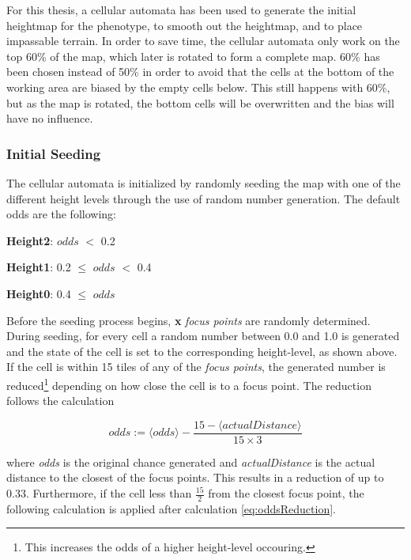 For this thesis, a cellular automata has been used to generate the initial heightmap for the phenotype, to smooth out the heightmap, and to place impassable terrain. In order to save time, the cellular automata only work on the top 60\% of the map, which later is rotated to form a complete map. 60\% has been chosen instead of 50\% in order to avoid that the cells at the bottom of the working area are biased by the empty cells below. This still happens with 60\%, but as the map is rotated, the bottom cells will be overwritten and the bias will have no influence.

\subsubsection{Initial Seeding}
\label{methodology_ca_our_initial}

The cellular automata is initialized by randomly seeding the map with one of the different height levels through the use of random number generation. The default odds are the following:

\begin{my_itemize}

	\item \textbf{Height2}: $odds$ $<$ 0.2

	\item \textbf{Height1}: 0.2 $\le$ $odds$ $<$ 0.4

	\item \textbf{Height0}: 0.4 $\le$ $odds$

\end{my_itemize}

Before the seeding process begins, \textbf{x} \textit{focus points} are randomly determined. During seeding, for every cell a random number between 0.0 and 1.0 is generated and the state of the cell is set to the corresponding height-level, as shown above. If the cell is within 15 tiles of any of the \textit{focus points}, the generated number is reduced\footnote{This increases the odds of a higher height-level occouring.} depending on how close the cell is to a focus point. The reduction follows the calculation

\begin{equation} \label{eq:oddsReduction}
	odds := \langle odds\rangle - \frac{15 - \langle actualDistance\rangle}{15 \times 3}
\end{equation}

where \textit{odds} is the original chance generated and \textit{actualDistance} is the actual distance to the closest of the focus points. This results in a reduction of up to 0.33. Furthermore, if the cell less than $\frac{15}{2}$ from the closest focus point, the following calculation is applied after calculation \ref{eq:oddsReduction}.

